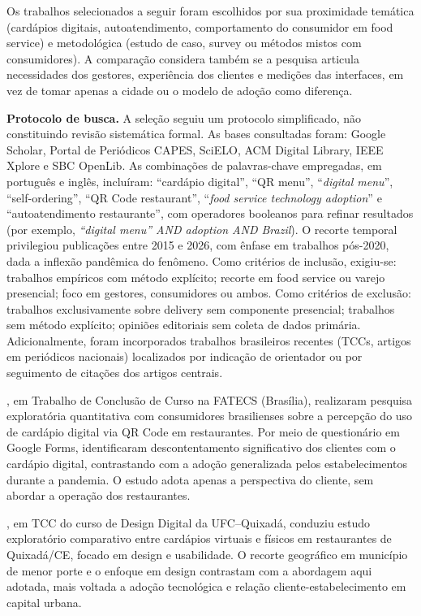 Os trabalhos selecionados a seguir foram escolhidos por sua proximidade temática (cardápios digitais, autoatendimento, comportamento do consumidor em food service) e metodológica (estudo de caso, survey ou métodos mistos com consumidores). A comparação considera também se a pesquisa articula necessidades dos gestores, experiência dos clientes e medições das interfaces, em vez de tomar apenas a cidade ou o modelo de adoção como diferença.

\textbf{Protocolo de busca.} A seleção seguiu um protocolo simplificado, não constituindo revisão sistemática formal. As bases consultadas foram: Google Scholar, Portal de Periódicos CAPES, SciELO, ACM Digital Library, IEEE Xplore e SBC OpenLib. As combinações de palavras-chave empregadas, em português e inglês, incluíram: ``cardápio digital'', ``QR menu'', ``\emph{digital menu}'', ``self-ordering'', ``QR Code restaurant'', ``\emph{food service technology adoption}'' e ``autoatendimento restaurante'', com operadores booleanos para refinar resultados (por exemplo, \emph{``digital menu'' AND adoption AND Brazil}). O recorte temporal privilegiou publicações entre 2015 e 2026, com ênfase em trabalhos pós-2020, dada a inflexão pandêmica do fenômeno. Como critérios de inclusão, exigiu-se: trabalhos empíricos com método explícito; recorte em food service ou varejo presencial; foco em gestores, consumidores ou ambos. Como critérios de exclusão: trabalhos exclusivamente sobre delivery sem componente presencial; trabalhos sem método explícito; opiniões editoriais sem coleta de dados primária. Adicionalmente, foram incorporados trabalhos brasileiros recentes (TCCs, artigos em periódicos nacionais) localizados por indicação de orientador ou por seguimento de citações dos artigos centrais.

, em Trabalho de Conclusão de Curso na FATECS (Brasília), realizaram pesquisa exploratória quantitativa com consumidores brasilienses sobre a percepção do uso de cardápio digital via QR Code em restaurantes. Por meio de questionário em Google Forms, identificaram descontentamento significativo dos clientes com o cardápio digital, contrastando com a adoção generalizada pelos estabelecimentos durante a pandemia. O estudo adota apenas a perspectiva do cliente, sem abordar a operação dos restaurantes.

, em TCC do curso de Design Digital da UFC--Quixadá, conduziu estudo exploratório comparativo entre cardápios virtuais e físicos em restaurantes de Quixadá/CE, focado em design e usabilidade. O recorte geográfico em município de menor porte e o enfoque em design contrastam com a abordagem aqui adotada, mais voltada a adoção tecnológica e relação cliente-estabelecimento em capital urbana.

